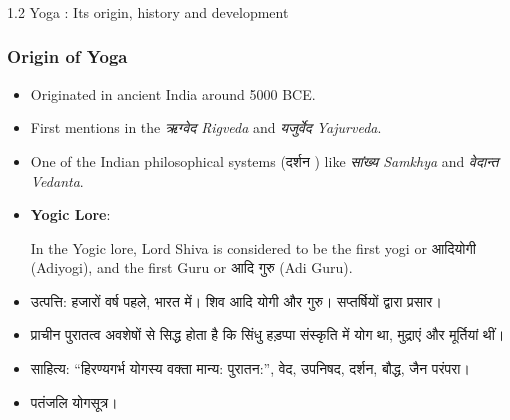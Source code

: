 \begin{frame}[fragile]\frametitle{}
\begin{center}
{\Large 1.2 Yoga : Its origin, history and development}
\end{center}
\end{frame}


\begin{frame}[fragile]\frametitle{Origin of Yoga}

      \begin{itemize}
		\item Originated in ancient India around 5000 BCE.
		\item First mentions in the \textit{ऋग्वेद  Rigveda} and \textit{यजुर्वेद  Yajurveda}.
		\item One of the Indian philosophical systems (दर्शन ) like \textit{सांख्य  Samkhya} and \textit{वेदान्त  Vedanta}.
          
          
          
          
        \item \textbf{Yogic Lore}: 
          
          In the Yogic lore, Lord Shiva is considered to be the first yogi or आदियोगी (Adiyogi), and the first Guru or आदि गुरु (Adi Guru).
          		
		\item उत्पत्ति: हजारों वर्ष पहले, भारत में। शिव आदि योगी और गुरु। सप्तर्षियों द्वारा प्रसार।
		\item प्राचीन पुरातत्व अवशेषों से सिद्ध होता है कि सिंधु हड़प्पा संस्कृति में योग था, मुद्राएं और मूर्तियां थीं।
		\item साहित्य: “हिरण्यगर्भ योगस्य वक्ता मान्य: पुरातन:”, वेद, उपनिषद, दर्शन, बौद्ध, जैन परंपरा।
		\item  पतंजलि योगसूत्र।
	  \end{itemize}

\end{frame}

